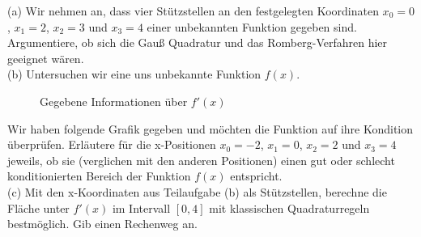 \documentclass{scrartcl}
\begin{document}
	(a)
	Wir nehmen an, dass vier Stützstellen an den festgelegten Koordinaten $x_0 = 0$, $x_1 = 2$, $x_2 = 3$ und $x_3 = 4$ einer unbekannten Funktion gegeben sind. Argumentiere, ob sich die Gauß Quadratur und das Romberg-Verfahren hier geeignet wären.
	\lbreak \lbreak \lbreak \lbreak
	\\
	(b)
	Untersuchen wir eine uns unbekannte Funktion $f(x)$.
	\begin{figure}[ht]
		\centering
		\caption{Gegebene Informationen über $f'(x)$}
	\end{figure}Wir haben folgende Grafik gegeben und möchten die Funktion auf ihre Kondition überprüfen.
	Erläutere für die x-Positionen $x_0 = -2$, $x_1 =0$, $x_2 = 2$ und $x_3 = 4$ jeweils, ob sie (verglichen mit den anderen Positionen) einen gut oder schlecht konditionierten Bereich der Funktion $f(x)$ entspricht.
	\lbreak \lbreak \lbreak
	\\
	(c) 
	Mit den x-Koordinaten aus Teilaufgabe (b) als Stützstellen, berechne die Fläche unter $f'(x)$ im Intervall $[0, 4]$ mit klassischen Quadraturregeln bestmöglich. Gib einen Rechenweg an.


\end{document}
